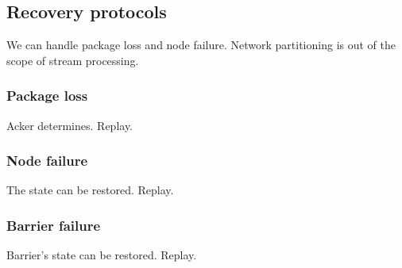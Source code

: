 \subsection{Recovery protocols}
We can handle package loss and node failure. Network partitioning is out of the scope of stream processing.

\subsubsection{Package loss}
Acker determines. Replay.

\subsubsection{Node failure}
The state can be restored. Replay.

\subsubsection{Barrier failure}
Barrier's state can be restored. Replay.